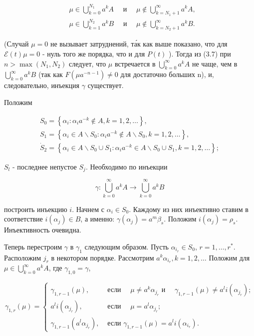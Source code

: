 \documentclass[10pt]{article}
\begin{document}
$$
\begin{aligned}
& \mu \in \bigcup_{k=0}^{N_{1}} a^{k} A \quad \text { и } \quad \mu \notin \bigcup_{k=N_{1}+1}^{\infty} a^{k} A, \\
& \mu \in \bigcup_{k=1}^{N_{2}} a^{k} B \quad \text { и } \quad \mu \notin \bigcup_{k=N_{2}+1}^{\infty} a^{k} B .
\end{aligned}
$$

(Случай $\mu=0$ не вызывает затруднений, та́к как выше показано, что для $\mathscr{E}(t) \mu=0$ - нуль того же порядка, что и для $P(t)$ ). Тогда из (3.7) при $n>\max \left(N_{1}, N_{2}\right)$ следует, что $\mu$ встречается в $\bigcup_{k=0}^{\infty} a^{k} A$ не чаще, чем в $\bigcup_{k=0}^{\infty} a^{k} B$ (так как $F\left(\mu a^{-n-1}\right) \neq 0$ для достаточно больших n), и, следовательно, инъекция $\gamma$ существует.

Положим

$$
\begin{gathered}
S_{0}=\left\{\alpha_{i}: \alpha_{i} a^{-k} \notin A, k=1,2, \ldots\right\}, \\
S_{1}=\left\{\alpha_{i} \in A \backslash S_{0}: \alpha_{i} a^{-k} \notin A \backslash S_{0}, k=1,2, \ldots\right\}, \\
\dot{S}_{2}=\left\{\alpha_{i} \in A \backslash S_{0} \cup S_{1}: \alpha_{i} a^{-k} \in A \backslash S_{0} \cup S_{1}, k=1,2, \ldots\right\} ;
\end{gathered}
$$

$S_{l}$ - последнее непустое $S_{j}$. Необходимо по инъекции

$$
\gamma: \bigcup_{k=0}^{\infty} a^{k} A \rightarrow \bigcup_{k=0}^{\infty} a^{k} B
$$

построить инъекцию $i$. Начнем с $\alpha_{i} \in S_{0}$. Каждому из них инъективно ставим в соответствие $i\left(\alpha_{j}\right) \in B$, а именно: $\gamma\left(\alpha_{j}\right)=a^{m} \beta_{s}$. Положим $i\left(\alpha_{j}\right)=\rho_{s}$. Инъективность очевидна.

Теперь перестроим $\gamma$ в $\gamma_{1}$ следующим образом. Пусть $\alpha_{i_{r}} \in S_{0}$, $r=1, \ldots, r^{*}$. Расположим $j_{r}$ в некотором порядке. Рассмотрим $a^{k} \alpha_{i_{r}}, k=1,2, \ldots$ Положим для $\mu \in \bigcup_{k=0}^{\infty} a^{k} A$, где $\gamma_{1,0}=\gamma$,

$$
\gamma_{1, r}(\mu)= \begin{cases}\gamma_{1, r-1}(\mu), & \text { если } \quad \mu \neq a^{k} \alpha_{j_{r}} \text { и } \quad \gamma_{1, r-1}(\mu) \neq a^{l} i\left(\alpha_{j_{r}}\right) ; \\ a^{l} i\left(\alpha_{j_{r}}\right), & \text { если } \quad \mu=a^{l} \alpha_{j_{r}} ; \\ \gamma_{1, r-1}\left(a^{l} \alpha_{j_{r}}\right), & \text { если } \gamma_{1, r-1}(\mu)=a^{l} i\left(\alpha_{i_{r}}\right) .\end{cases}
$$
\end{document}
